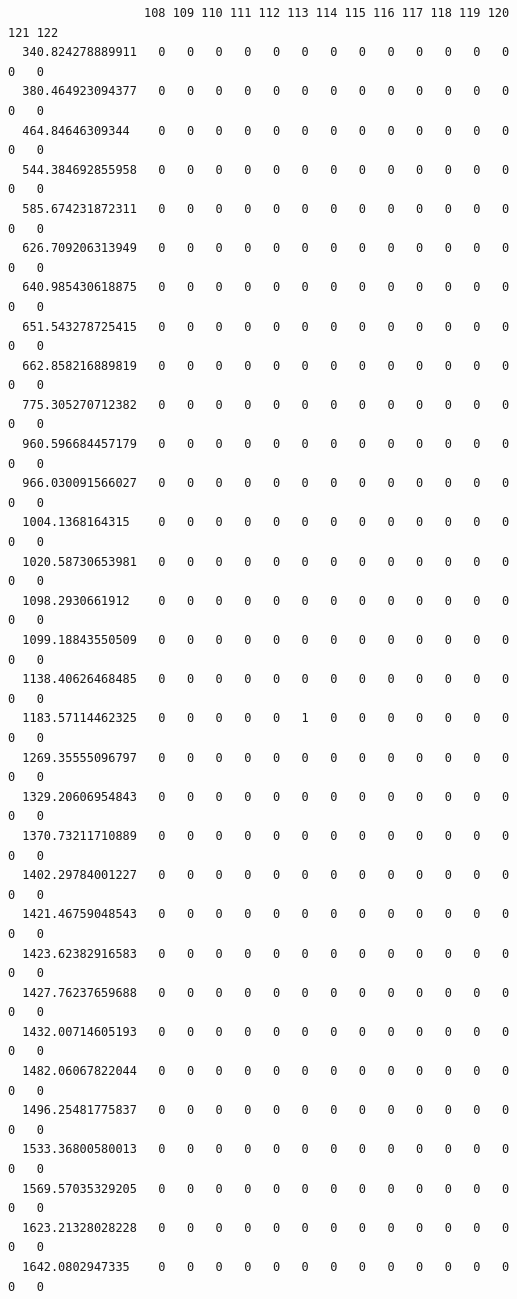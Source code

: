 \documentclass[
  letterpaper,
  DIV=11,
  numbers=noendperiod]{scrartcl}
\begin{document}
\begin{verbatim}
                   108 109 110 111 112 113 114 115 116 117 118 119 120 121 122
  340.824278889911   0   0   0   0   0   0   0   0   0   0   0   0   0   0   0
  380.464923094377   0   0   0   0   0   0   0   0   0   0   0   0   0   0   0
  464.84646309344    0   0   0   0   0   0   0   0   0   0   0   0   0   0   0
  544.384692855958   0   0   0   0   0   0   0   0   0   0   0   0   0   0   0
  585.674231872311   0   0   0   0   0   0   0   0   0   0   0   0   0   0   0
  626.709206313949   0   0   0   0   0   0   0   0   0   0   0   0   0   0   0
  640.985430618875   0   0   0   0   0   0   0   0   0   0   0   0   0   0   0
  651.543278725415   0   0   0   0   0   0   0   0   0   0   0   0   0   0   0
  662.858216889819   0   0   0   0   0   0   0   0   0   0   0   0   0   0   0
  775.305270712382   0   0   0   0   0   0   0   0   0   0   0   0   0   0   0
  960.596684457179   0   0   0   0   0   0   0   0   0   0   0   0   0   0   0
  966.030091566027   0   0   0   0   0   0   0   0   0   0   0   0   0   0   0
  1004.1368164315    0   0   0   0   0   0   0   0   0   0   0   0   0   0   0
  1020.58730653981   0   0   0   0   0   0   0   0   0   0   0   0   0   0   0
  1098.2930661912    0   0   0   0   0   0   0   0   0   0   0   0   0   0   0
  1099.18843550509   0   0   0   0   0   0   0   0   0   0   0   0   0   0   0
  1138.40626468485   0   0   0   0   0   0   0   0   0   0   0   0   0   0   0
  1183.57114462325   0   0   0   0   0   1   0   0   0   0   0   0   0   0   0
  1269.35555096797   0   0   0   0   0   0   0   0   0   0   0   0   0   0   0
  1329.20606954843   0   0   0   0   0   0   0   0   0   0   0   0   0   0   0
  1370.73211710889   0   0   0   0   0   0   0   0   0   0   0   0   0   0   0
  1402.29784001227   0   0   0   0   0   0   0   0   0   0   0   0   0   0   0
  1421.46759048543   0   0   0   0   0   0   0   0   0   0   0   0   0   0   0
  1423.62382916583   0   0   0   0   0   0   0   0   0   0   0   0   0   0   0
  1427.76237659688   0   0   0   0   0   0   0   0   0   0   0   0   0   0   0
  1432.00714605193   0   0   0   0   0   0   0   0   0   0   0   0   0   0   0
  1482.06067822044   0   0   0   0   0   0   0   0   0   0   0   0   0   0   0
  1496.25481775837   0   0   0   0   0   0   0   0   0   0   0   0   0   0   0
  1533.36800580013   0   0   0   0   0   0   0   0   0   0   0   0   0   0   0
  1569.57035329205   0   0   0   0   0   0   0   0   0   0   0   0   0   0   0
  1623.21328028228   0   0   0   0   0   0   0   0   0   0   0   0   0   0   0
  1642.0802947335    0   0   0   0   0   0   0   0   0   0   0   0   0   0   0

\end{verbatim}
\end{document}
